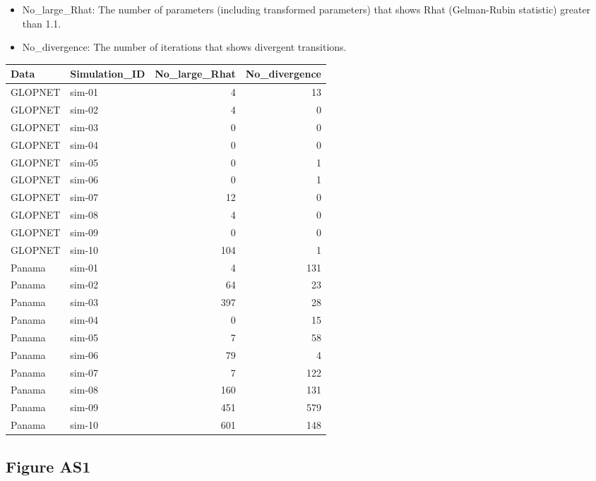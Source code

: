 \documentclass[
  12pt,
  letterpaper,
  DIV=11,
  numbers=noendperiod]{scrartcl}
\begin{document}
\begin{itemize}
\item
  No\_large\_Rhat: The number of parameters (including transformed
  parameters) that shows Rhat (Gelman-Rubin statistic) greater than 1.1.
\item
  No\_divergence: The number of iterations that shows divergent
  transitions.
\end{itemize}

\begin{longtable*}[t]{llrr}
\toprule
Data & Simulation\_ID & No\_large\_Rhat & No\_divergence\\
\midrule
GLOPNET & sim-01 & 4 & 13\\
GLOPNET & sim-02 & 4 & 0\\
GLOPNET & sim-03 & 0 & 0\\
GLOPNET & sim-04 & 0 & 0\\
GLOPNET & sim-05 & 0 & 1\\
\addlinespace
GLOPNET & sim-06 & 0 & 1\\
GLOPNET & sim-07 & 12 & 0\\
GLOPNET & sim-08 & 4 & 0\\
GLOPNET & sim-09 & 0 & 0\\
GLOPNET & sim-10 & 104 & 1\\
\addlinespace
Panama & sim-01 & 4 & 131\\
Panama & sim-02 & 64 & 23\\
Panama & sim-03 & 397 & 28\\
Panama & sim-04 & 0 & 15\\
Panama & sim-05 & 7 & 58\\
\addlinespace
Panama & sim-06 & 79 & 4\\
Panama & sim-07 & 7 & 122\\
Panama & sim-08 & 160 & 131\\
Panama & sim-09 & 451 & 579\\
Panama & sim-10 & 601 & 148\\
\bottomrule
\end{longtable*}

\newpage

\subsection{Figure AS1}\label{figure-as1}
\end{document}
